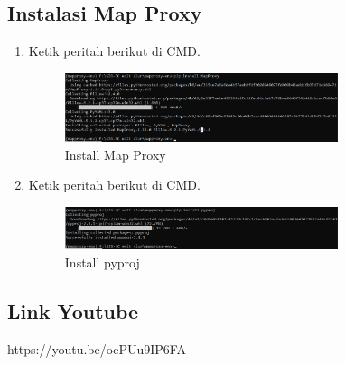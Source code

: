 \subsection{Instalasi Map Proxy}
\begin{enumerate}
	\item  Ketik peritah berikut di CMD.
	\hfill\break
	\begin{figure}[H]
		\includegraphics[width=8cm]{figures/Tugas4/1174083/pic10.png}
		\centering
		\caption{Install Map Proxy}
	\end{figure}
	\item  Ketik peritah berikut di CMD.
	\hfill\break
	\begin{figure}[H]
		\includegraphics[width=8cm]{figures/Tugas4/1174083/pic11.png}
		\centering
		\caption{Install pyproj}
	\end{figure}
\end{enumerate}
\subsection{Link Youtube}
https://youtu.be/oePUu9IP6FA

